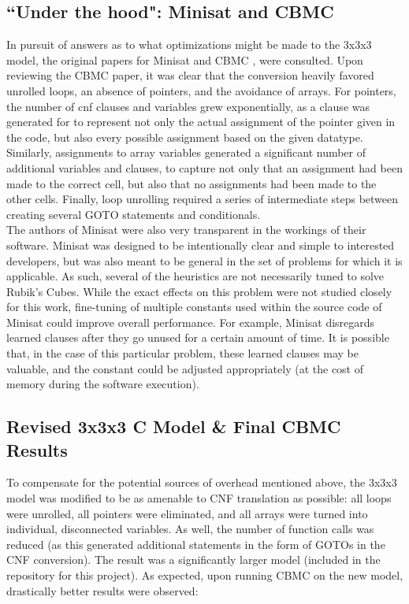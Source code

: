 \documentclass{article}
\begin{document}
\subsection {``Under the hood": Minisat and CBMC}

In pursuit of answers as to what optimizations might be made to the 3x3x3 model, the original papers for Minisat \cite{een} and CBMC \cite{clarke}, \cite{clarke2} were consulted. Upon reviewing the CBMC paper, it was clear that the conversion heavily favored unrolled loops, an absence of pointers, and the avoidance of arrays. For pointers, the number of cnf clauses and variables grew exponentially, as a clause was generated for to represent not only the actual assignment of the pointer given in the code, but also every possible assignment based on the given datatype. Similarly, assignments to array variables generated a significant number of additional variables and clauses, to capture not only that an assignment had been made to the correct cell, but also that no assignments had been made to the other cells. Finally, loop unrolling required a series of intermediate steps between creating several GOTO statements and conditionals. \\

\noindent The authors of Minisat were also very transparent in the workings of their software. Minisat was designed to be intentionally clear and simple to interested developers, but was also meant to be general in the set of problems for which it is applicable. As such, several of the heuristics are not necessarily tuned to solve Rubik's Cubes. While the exact effects on this problem were not studied closely for this work, fine-tuning of multiple constants used within the source code of Minisat could improve overall performance. For example, Minisat disregards learned clauses after they go unused for a certain amount of time. It is possible that, in the case of this particular problem, these learned clauses may be valuable, and the constant could be adjusted appropriately (at the cost of memory during the software execution).

\subsection {Revised 3x3x3 C Model \& Final CBMC Results}

To compensate for the potential sources of overhead mentioned above, the 3x3x3 model was modified to be as amenable to CNF translation as possible: all loops were unrolled, all pointers were eliminated, and all arrays were turned into individual, disconnected variables. As well, the number of function calls was reduced (as this generated additional statements in the form of GOTOs in the CNF conversion). The result was a significantly larger model (included in the repository for this project). As expected, upon running CBMC on the new model, drastically better results were observed:\\
\end{document}

